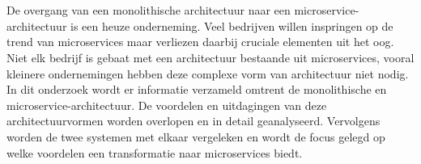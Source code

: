 
%
%

%



\chapter*{}

De overgang van een monolithische architectuur naar een microservice-architectuur is een heuze onderneming. Veel bedrijven willen inspringen op de trend van microservices maar verliezen daarbij cruciale elementen uit het oog. Niet elk bedrijf is gebaat met een architectuur bestaande uit microservices, vooral kleinere ondernemingen hebben deze complexe vorm van architectuur niet nodig.
In dit onderzoek wordt er informatie verzameld omtrent de monolithische en microservice-architectuur. De voordelen en uitdagingen van deze architectuurvormen worden overlopen en in detail geanalyseerd. Vervolgens worden de twee systemen met elkaar vergeleken en wordt de focus gelegd op welke voordelen een transformatie naar microservices biedt. 

